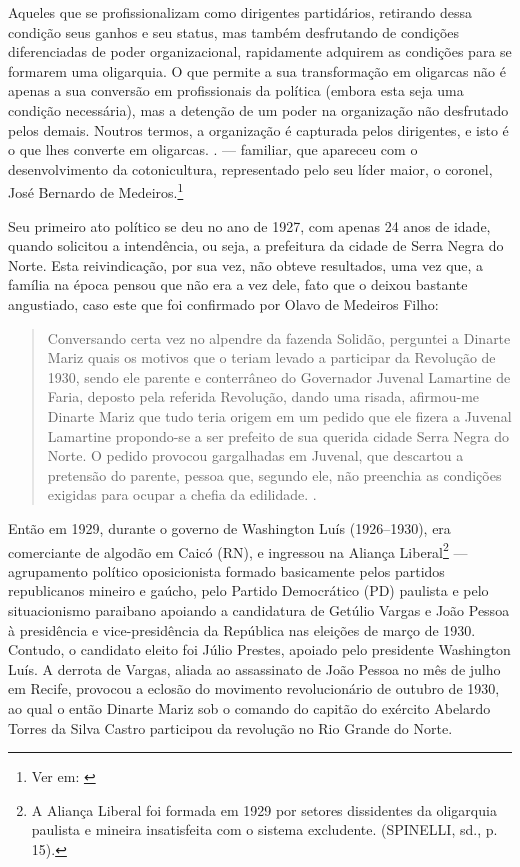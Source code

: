 \begin{refsection}
{    Aqueles que se profissionalizam como dirigentes partidários, retirando dessa condição seus ganhos e seu status, mas também desfrutando de condições diferenciadas de poder organizacional, rapidamente adquirem as condições para se formarem uma oligarquia. O que permite a sua transformação em oligarcas não é apenas a sua conversão em profissionais da política (embora esta seja uma condição necessária), mas a detenção de um poder na organização não desfrutado pelos demais. Noutros termos, a organização é capturada pelos dirigentes, e isto é o que lhes converte em oligarcas. \cite[p.~48]{Couto2012Oligarquias}.} --- familiar, que apareceu com o desenvolvimento da cotonicultura, representado pelo seu líder maior, o coronel, José Bernardo de Medeiros.\footnote{Ver em: \textcite[p.~187]{Lamartine2003Personagens}}

    Seu primeiro ato político se deu no ano de 1927, com apenas 24 anos de idade, quando solicitou a intendência, ou seja, a prefeitura da cidade de Serra Negra do Norte. Esta reivindicação, por sua vez, não obteve resultados, uma vez que, a família na época pensou que não era a vez dele, fato que o deixou bastante angustiado, caso este que foi confirmado por Olavo de Medeiros Filho:

    \begin{quotation}
        Conversando certa vez no alpendre da fazenda Solidão, perguntei a Dinarte Mariz quais os motivos que o teriam levado a participar da Revolução de 1930, sendo ele parente e conterrâneo do Governador Juvenal Lamartine de Faria, deposto pela referida Revolução, dando uma risada, afirmou-me Dinarte Mariz que tudo teria origem em um pedido que ele fizera a Juvenal Lamartine propondo-se a ser prefeito de sua querida cidade Serra Negra do Norte. O pedido provocou gargalhadas em Juvenal, que descartou a pretensão do parente, pessoa que, segundo ele, não preenchia as condições exigidas para ocupar a chefia da edilidade. \cite[p.~166]{Lima2003Solidao}.
    \end{quotation}

    Então em 1929, durante o governo de Washington Luís (1926--1930), era comerciante de algodão em Caicó (RN), e ingressou na Aliança Liberal\footnote{A Aliança Liberal foi formada em 1929 por setores dissidentes da oligarquia paulista e mineira insatisfeita com o sistema excludente. (SPINELLI, sd., p. 15). } --- agrupamento político oposicionista formado basicamente pelos partidos republicanos mineiro e gaúcho, pelo Partido Democrático (PD) paulista e pelo situacionismo paraibano apoiando a candidatura de Getúlio Vargas e João Pessoa à presidência e vice-presidência da República nas eleições de março de 1930. Contudo, o candidato eleito foi Júlio Prestes, apoiado pelo presidente Washington Luís. A derrota de Vargas, aliada ao assassinato de João Pessoa no mês de julho em Recife, provocou a eclosão do movimento revolucionário de outubro de 1930, ao qual o então Dinarte Mariz sob o comando do capitão do exército Abelardo Torres da Silva Castro participou da revolução no Rio Grande do Norte. 


\end{refsection}
